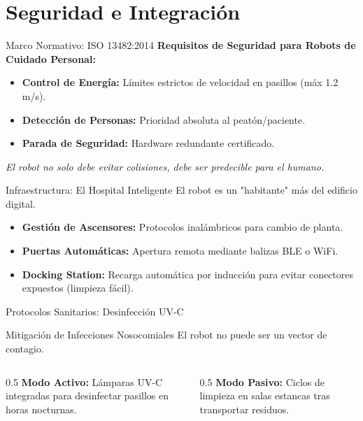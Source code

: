 \section{Seguridad e Integración}
\begin{frame}{Marco Normativo: ISO 13482:2014}
    \textbf{Requisitos de Seguridad para Robots de Cuidado Personal:}
    \begin{itemize}
        \item[$\bullet$] \textbf{Control de Energía:} Límites estrictos de velocidad en pasillos (máx 1.2 m/s).
        \item[$\bullet$] \textbf{Detección de Personas:} Prioridad absoluta al peatón/paciente.
        \item[$\bullet$] \textbf{Parada de Seguridad:} Hardware redundante certificado.
    \end{itemize}
    \vspace{0.3cm}
    \textit{El robot no solo debe evitar colisiones, debe ser predecible para el humano.}
\end{frame}

\begin{frame}{Infraestructura: El Hospital Inteligente}
    El robot es un "habitante" más del edificio digital.
    \begin{itemize}
        \item \textbf{Gestión de Ascensores:} Protocolos inalámbricos para cambio de planta.
        \item \textbf{Puertas Automáticas:} Apertura remota mediante balizas BLE o WiFi.
        \item \textbf{Docking Station:} Recarga automática por inducción para evitar conectores expuestos (limpieza fácil).
    \end{itemize}
\end{frame}

\begin{frame}{Protocolos Sanitarios: Desinfección UV-C}
    \begin{block}{Mitigación de Infecciones Nosocomiales}
        El robot no puede ser un vector de contagio.
    \end{block}
    \vspace{0.3cm}
    \begin{columns}
        \begin{column}{0.5\textwidth}
            \textbf{Modo Activo:}
            Lámparas UV-C integradas para desinfectar pasillos en horas nocturnas.
        \end{column}
        \begin{column}{0.5\textwidth}
            \textbf{Modo Pasivo:}
            Ciclos de limpieza en salas estancas tras transportar residuos.
        \end{column}
    \end{columns}
\end{frame}

